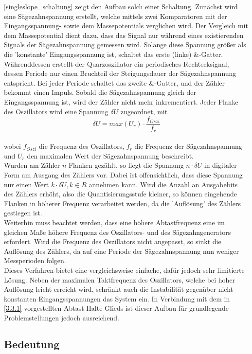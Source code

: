 \ref{singleslope_schaltung} zeigt den Aufbau solch einer Schaltung. Zunächst wird eine Sägezahnspannung erstellt, welche mittels zwei Komparatoren mit der Eingangsspannung- sowie dem Massepotentials verglichen wird. Der Vergleich mit dem Massepotential dient dazu, dass das Signal nur während eines existierenden Signals der Sägezahnspannung gemessen wird. Solange diese Spannung größer als die 'konstante' Eingangsspannung ist, schaltet das erste (linke) \&-Gatter. Währenddessen erstellt der Quarzoszillator ein periodisches Rechtecksignal, dessen Periode nur einen Bruchteil der Steigungsdauer der Sägezahnspannung entspricht. Bei jeder Periode schaltet das zweite \&-Gatter, und der Zähler bekommt einen Impuls. Sobald die Sägezahnspannung gleich der Eingangsspannung ist, wird der Zähler nicht mehr inkrementiert. Jeder Flanke des Oszillators wird eine Spannung $\delta U$ zugeordnet, mit 
$$\delta  U = max(U_r) \cdot \frac{f_{Oszi}}{f_r}$$\\
wobei $f_{Oszi}$ die Frequenz des Oszillators, $f_r$ die Frequenz der Sägezahnspannung und $U_r$ den maximalen Wert der Sägezahnspannung beschreibt.\\
Wurden am Zähler $n$ Flanken gezählt, so liegt die Spannung $n \cdot \delta U$ in digitaler Form am Ausgang des Zählers vor. Dabei ist offensichtlich, dass diese Spannung nur einen Wert $k \cdot \delta U, k \in R$ annehmen kann. Wird die Anzahl an Ausgabebits des 	Zählers erhöht, also die Quantisierungsstufe kleiner, so können eingehende Flanken in höherer Frequenz verarbeitet werden, da die 'Auflösung' des Zählers gestiegen ist.\\
Weiterhin muss beachtet werden, dass eine höhere Abtastfrequenz eine im gleichen Maße höhere Frequenz des Oszillators- und des Sägezahngenerators erfordert. Wird die Frequenz des Oszillators nicht angepasst, so sinkt die Auflösung des Zählers, da auf eine Periode der Sägezahnspannung nun weniger Messperioden folgen.\\

Dieses Verfahren bietet eine vergleichsweise einfache, dafür jedoch sehr limitierte Lösung. Neben der maximalen Taktfrequenz des Oszillators, welche bei hoher Auflösung leicht erreicht wird, schränkt auch die Instabilität gegenüber nicht konstanten Eingangsspannungen das System ein. In Verbindung mit dem in \ref{3.3.1} vorgestellten Abtast-Halte-Glieds ist dieser Aufbau für grundlegende Problemstellungen jedoch ausreichend.

\subsection{Bedeutung}\label{3.4}

